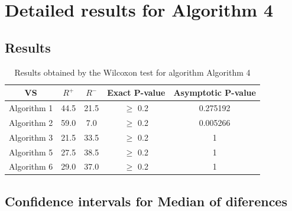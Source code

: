 \documentclass[a4paper,10pt]{article}
\begin{document}
 \clearpage 


\section{Detailed results for Algorithm 4}


\subsection{Results}

\begin{table}[!htp]
\centering\small
\begin{tabular}{
|c|c|c|c|c|}
\hline
 VS & $R^{+}$ & $R^{-}$ & Exact P-value & Asymptotic P-value \\ \hline 
Algorithm 1 & 44.5 & 21.5 & $\geq$ 0.2 & 0.275192\\ \hline 
Algorithm 2 & 59.0 & 7.0 & $\geq$ 0.2 & 0.005266\\ \hline 
Algorithm 3 & 21.5 & 33.5 & $\geq$ 0.2 & 1\\ \hline 
Algorithm 5 & 27.5 & 38.5 & $\geq$ 0.2 & 1\\ \hline 
Algorithm 6 & 29.0 & 37.0 & $\geq$ 0.2 & 1\\ \hline 

\end{tabular}
\caption{Results obtained by the Wilcoxon test for algorithm Algorithm 4}
\end{table}

\subsection{Confidence intervals for Median of diferences}
\end{document}
